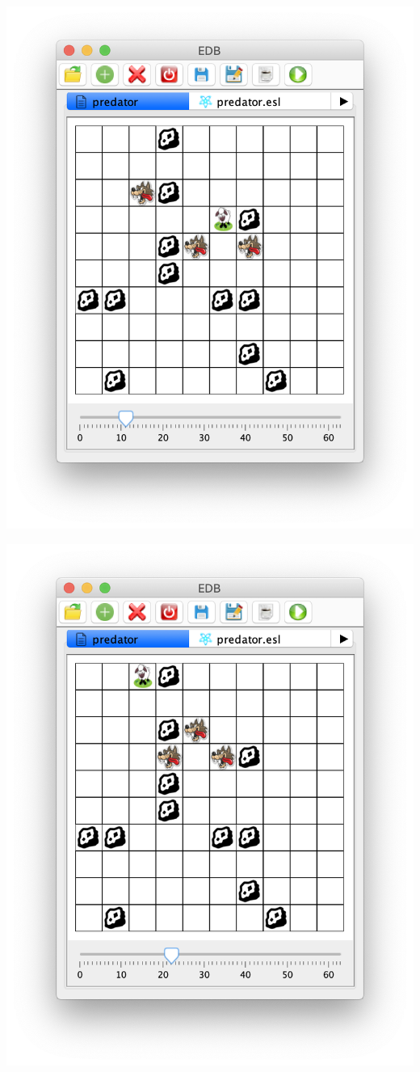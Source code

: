 \documentclass[5p,times]{elsarticle}
\begin{document}
\begin{center}
\includegraphics[width=\columnwidth]{pred2}
\end{center}
\begin{center}
\includegraphics[width=\columnwidth]{pred3}
\end{center}
\end{document}
